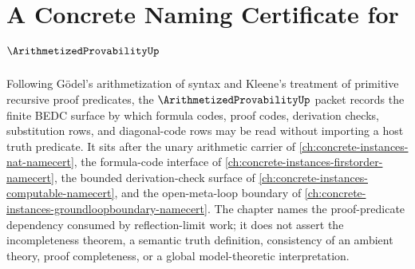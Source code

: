 \chapter{A Concrete Naming Certificate for $\ArithmetizedProvabilityUp$}
\label{ch:concrete-instances-arithmetized-provability-namecert}

Following G\"odel's arithmetization of syntax and Kleene's treatment of primitive recursive proof predicates, the $\ArithmetizedProvabilityUp$ packet records the finite BEDC surface by which formula codes, proof codes, derivation checks, substitution rows, and diagonal-code rows may be read without importing a host truth predicate. It sits after the unary arithmetic carrier of \autoref{ch:concrete-instances-nat-namecert}, the formula-code interface of \autoref{ch:concrete-instances-firstorder-namecert}, the bounded derivation-check surface of \autoref{ch:concrete-instances-computable-namecert}, and the open-meta-loop boundary of \autoref{ch:concrete-instances-groundloopboundary-namecert}. The chapter names the proof-predicate dependency consumed by reflection-limit work; it does not assert the incompleteness theorem, a semantic truth definition, consistency of an ambient theory, proof completeness, or a global model-theoretic interpretation.

